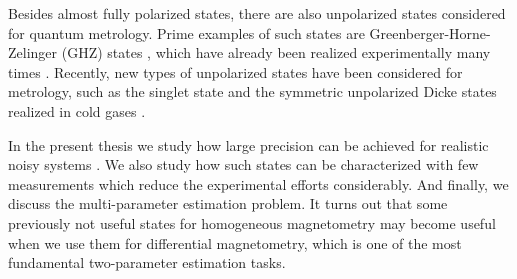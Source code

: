 Besides almost fully polarized states, there are also unpolarized states considered for quantum metrology.
Prime examples of such states are Greenberger-Horne-Zelinger (GHZ) states \cite{Greenberger1990}, which have already been realized experimentally many times \cite{Leibfried2004, Bouwmeester1999, Pan2000, Zhao2003, Lu2007, Gao2010, Sackett2000, Monz2011}.
Recently, new types of unpolarized states have been considered for metrology, such as the singlet state \cite{Urizar-Lanz2013, Behbood2014} and the symmetric unpolarized Dicke states realized in cold gases \cite{Luecke2011, Hamley2012, Krischek2011}.

In the present thesis we study how large precision can be achieved for realistic noisy systems \cite{Escher2011, Demkowicz-Dobrzanski2012}.
We also study how such states can be characterized with few measurements which reduce the experimental efforts considerably.
And finally, we discuss the multi-parameter estimation problem.
It turns out that some previously not useful states for homogeneous magnetometry may become useful when we use them for differential magnetometry, which is one of the most fundamental two-parameter estimation tasks.

